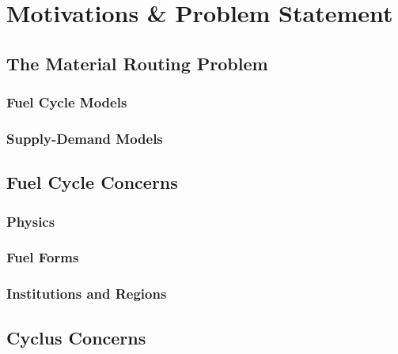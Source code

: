 \section{Motivations \& Problem Statement}

\subsection{The Material Routing Problem}

\subsubsection{Fuel Cycle Models}

\subsubsection{Supply-Demand Models}

\subsection{Fuel Cycle Concerns}

\subsubsection{Physics}


\subsubsection{Fuel Forms}


\subsubsection{Institutions and Regions}


\subsection{Cyclus Concerns}


